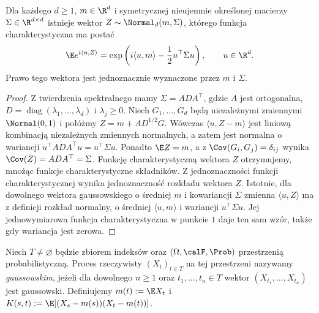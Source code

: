 \begin{stwierdzenie}
Dla każdego $d\ge1$, $m\in\R^d$ i symetrycznej nieujemnie
określonej macierzy $\Sigma\in\R^{d\times d}$ istnieje wektor
$Z\sim\Normal_d(m,\Sigma)$, którego funkcja charakterystyczna ma postać
\[
\E e^{i\langle u,Z\rangle}
=\exp\left(i\langle u,m\rangle-\frac12 u^\top\Sigma u\right),
\qquad u\in\R^d.
\]
Prawo tego wektora jest jednoznacznie wyznaczone przez $m$ i $\Sigma$.
\end{stwierdzenie}
\begin{proof}
Z twierdzenia spektralnego mamy $\Sigma=ADA^\top$, gdzie $A$
jest ortogonalna, $D=\operatorname{diag}(\lambda_1,\ldots,\lambda_d)$
i $\lambda_j\ge0$. Niech $G_1,\ldots,G_d$ będą niezależnymi
zmiennymi $\Normal(0,1)$ i połóżmy
$Z=m+AD^{1/2}G$. Wówczas
$\langle u,Z-m\rangle$ jest liniową kombinacją niezależnych
zmiennych normalnych, a zatem jest normalna o wariancji
$u^\top AD A^\top u=u^\top\Sigma u$.
Ponadto $\E Z=m$, a z $\Cov(G_i,G_j)=\delta_{ij}$
wynika $\Cov(Z)=AD A^\top=\Sigma$.
Funkcję charakterystyczną wektora $Z$
otrzymujemy, mnożąc funkcje charakterystyczne składników.
Z jednoznaczności funkcji charakterystycznej wynika jednoznaczność
rozkładu wektora $Z$. Istotnie, dla dowolnego wektora
gaussowskiego o średniej $m$ i kowariancji $\Sigma$ zmienna
$\langle u,Z\rangle$ ma z definicji rozkład normalny,
o średniej $\langle u,m\rangle$ i wariancji $u^\top\Sigma u$.
Jej jednowymiarowa funkcja charakterystyczna w punkcie $1$
daje ten sam wzór, także gdy wariancja jest zerowa.
\end{proof}

\begin{definicja}
Niech $T\ne\varnothing$ będzie zbiorem indeksów oraz
$(\Omega,\calF,\Prob)$ przestrzenią probabilistyczną. Proces
rzeczywisty $(X_t)_{t\in T}$ na tej przestrzeni nazywamy
\emph{gaussowskim}, jeżeli dla dowolnego $n\ge1$ oraz
$t_1,\ldots,t_n\in T$ wektor $(X_{t_1},\ldots,X_{t_n})$
jest gaussowski. Definiujemy
$m(t):=\E X_t$ i $K(s,t):=\E[(X_s-m(s))(X_t-m(t))]$.
\end{definicja}

